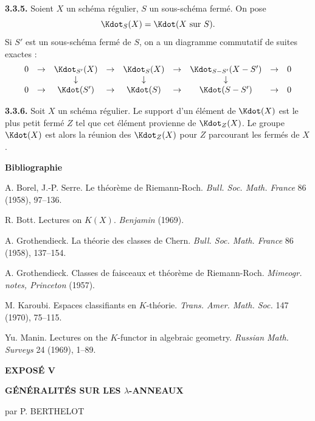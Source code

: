 \smallskip
\noindent\textbf{3.3.5.} Soient $X$ un sch\'ema r\'egulier, $S$ un sous-sch\'ema ferm\'e. On pose
\[
\Kdot_S(X) = \Kdot(X \text{ sur } S).
\]
Si $S'$ est un sous-sch\'ema ferm\'e de $S$, on a un diagramme commutatif de suites exactes :
\[
\begin{array}{ccccccccc}
0 & \to & \Kdot_{S'}(X) & \to & \Kdot_S(X) & \to & \Kdot_{S - S'}(X - S') & \to & 0 \\
  &     & \downarrow        &     & \downarrow        &     & \downarrow          &     &     \\
0 & \to & \Kdot(S') & \to & \Kdot(S) & \to & \Kdot(S - S') & \to & 0 \\
\end{array}
\]

\smallskip
\noindent\textbf{3.3.6.} Soit $X$ un sch\'ema r\'egulier. Le support d'un \'el\'ement de $\Kdot(X)$ est le plus petit ferm\'e $Z$ tel que cet \'el\'ement provienne de $\Kdot_Z(X)$. Le groupe $\Kdot(X)$ est alors la r\'eunion des $\Kdot_Z(X)$ pour $Z$ parcourant les ferm\'es de $X$.

\bigskip
\noindent\textbf{\Large Bibliographie}

\begin{enumerate}[label={[\arabic*]}]
\item A. Borel, J.-P. Serre. Le th\'eor\`eme de Riemann-Roch. \textit{Bull. Soc. Math. France} 86 (1958), 97--136.
\item R. Bott. Lectures on $K(X)$. \textit{Benjamin} (1969).
\item A. Grothendieck. La th\'eorie des classes de Chern. \textit{Bull. Soc. Math. France} 86 (1958), 137--154.
\item A. Grothendieck. Classes de faisceaux et th\'eor\`eme de Riemann-Roch. \textit{Mimeogr. notes, Princeton} (1957).
\item M. Karoubi. Espaces classifiants en $K$-th\'eorie. \textit{Trans. Amer. Math. Soc.} 147 (1970), 75--115.
\item Yu. Manin. Lectures on the $K$-functor in algebraic geometry. \textit{Russian Math. Surveys} 24 (1969), 1--89.
\end{enumerate}

\newpage
\begin{center}
\Large\textbf{EXPOS\'E V}
\end{center}
\begin{center}
\Large\textbf{G\'EN\'ERALIT\'ES SUR LES $\lambda$-ANNEAUX}
\end{center}
\begin{center}
par P. BERTHELOT
\end{center}

